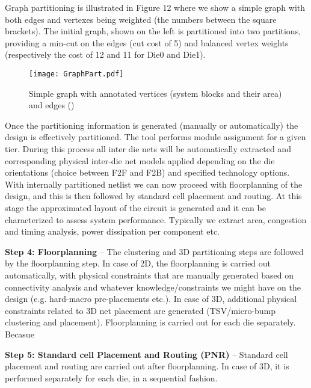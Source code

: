 Graph partitioning is illustrated in Figure 12 where we show a simple graph with both edges and vertexes being weighted (the numbers between the square brackets). The initial graph, shown on the left is partitioned into two partitions, providing a min-cut on the edges (cut cost of 5) and balanced vertex weights (respectively the cost of 12 and 11 for Die0 and Die1).

\begin{figure}[!b]%
\centering
\texttt{[image: GraphPart.pdf]}
\caption{Simple graph with annotated vertices (system blocks and their area) and edges ()\label{fig:GraphPart}}
\end{figure}

Once the partitioning information is generated (manually or automatically) the design is effectively partitioned. The tool performs module assignment for a given tier. During this process all inter die nets will be automatically extracted and corresponding physical inter-die net models applied depending on the die orientations (choice between F2F and F2B) and specified technology options. With internally partitioned netlist we can now proceed with floorplanning of the design, and this is then followed by standard cell placement and routing. At this stage the approximated layout of the circuit is generated and it can be characterized to assess system performance. Typically we extract area, congestion and timing analysis, power dissipation per component etc.

\textbf{Step 4: Floorplanning} – The clustering and 3D partitioning steps are followed by the floorplanning step. In case of 2D, the floorplanning is carried out automatically, with physical constraints that are manually generated based on connectivity analysis and whatever knowledge/constraints we might have on the design (e.g. hard-macro pre-placements etc.). In case of 3D, additional physical constraints related to 3D net placement are generated (TSV/micro-bump clustering and placement). Floorplanning is carried out for each die separately. Becasue

\textbf{Step 5: Standard cell Placement and Routing (PNR)} – Standard cell placement and routing are carried out after floorplanning. In case of 3D, it is performed separately for each die, in a sequential fashion.

